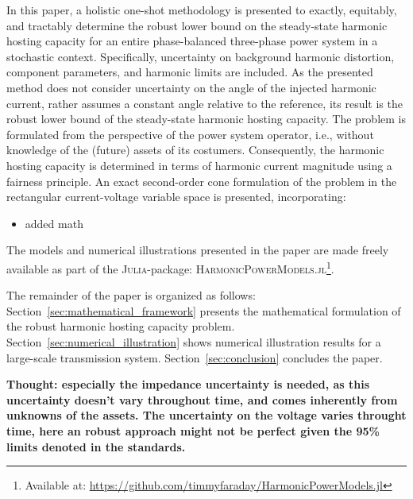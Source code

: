 In this paper, a holistic one-shot methodology is presented to exactly, equitably, and tractably determine the robust lower bound on the steady-state harmonic hosting capacity for an entire phase-balanced three-phase power system in a stochastic context. Specifically, uncertainty on background harmonic distortion, component parameters, and harmonic limits are included. As the presented method does not consider uncertainty on the angle of the injected harmonic current, rather assumes a constant angle relative to the reference, its result is the robust lower bound of the steady-state harmonic hosting capacity. The problem is formulated from the perspective of the power system operator, i.e., without knowledge of the (future) assets of its costumers. Consequently, the harmonic hosting capacity is determined in terms of harmonic current magnitude using a fairness principle. An exact second-order cone formulation of the problem in the rectangular current-voltage variable space is presented, incorporating:
\begin{itemize}
    \item added math
\end{itemize}
The models and numerical illustrations presented in the paper are made freely available as part of the \textsc{Julia}-package: \textsc{HarmonicPowerModels.jl}\footnote{Available at: \href{https://github.com/timmyfaraday/HarmonicPowerModels.jl}{https://github.com/timmyfaraday/HarmonicPowerModels.jl}}.

The remainder of the paper is organized as follows: Section~\ref{sec:mathematical_framework} presents the mathematical formulation of the robust harmonic hosting capacity problem. Section~\ref{sec:numerical_illustration} shows numerical illustration results for a large-scale transmission system. Section~\ref{sec:conclusion} concludes the paper.


\textbf{Thought: especially the impedance uncertainty is needed, as this uncertainty doesn't vary throughout time, and comes inherently from unknowns of the assets. The uncertainty on the voltage varies throught time, here an robust approach might not be perfect given the 95\% limits denoted in the standards.}